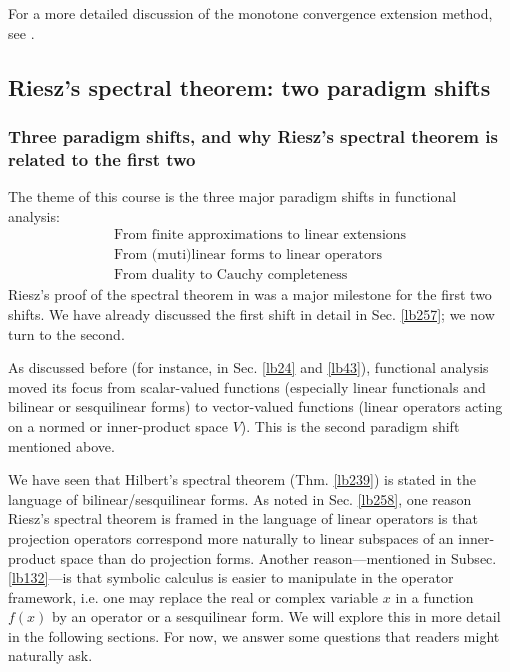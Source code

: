 \documentclass[12pt,b5paper,notitlepage]{article}
\theoremstyle{definition}
\theoremstyle{plain}
\numberwithin{equation}{section}
\begin{document}
For a more detailed discussion of the monotone convergence extension method, see \cite[Ch. 25]{Gui-A}.




\hypertarget{proofread}{}

\subsection{Riesz's spectral theorem: two paradigm shifts}\label{lb245}

\subsubsection{Three paradigm shifts, and why Riesz's spectral theorem is related to the first two}


The theme of this course is the three major paradigm shifts in functional analysis:
\begin{subequations}\label{eq147}
\begin{gather}
\text{From finite approximations to linear extensions}\label{eq147a}\\
\text{From (muti)linear forms to linear operators}\label{eq147b}\\
\text{From duality to Cauchy completeness}\label{eq147c}
\end{gather}
\end{subequations}
Riesz's proof of the spectral theorem in \cite{Rie13} was a major milestone for the first two shifts. We have already discussed the first shift in detail in Sec. \ref{lb257}; we now turn to the second.


As discussed before (for instance, in Sec. \ref{lb24} and \ref{lb43}), functional analysis moved its focus from scalar-valued functions (especially linear functionals and bilinear or sesquilinear forms) to vector-valued functions (linear operators acting on a normed or inner-product space $V$). This is the second paradigm shift mentioned above.



We have seen that Hilbert's spectral theorem (Thm. \ref{lb239}) is stated in the language of bilinear/sesquilinear forms. As noted in Sec. \ref{lb258}, one reason Riesz's spectral theorem is framed in the language of linear operators is that projection operators correspond more naturally to linear subspaces of an inner-product space than do projection forms. Another reason---mentioned in Subsec. \ref{lb132}---is that symbolic calculus is easier to manipulate in the operator framework, i.e. one may replace the real or complex variable $x$ in a function $f(x)$ by an operator or a sesquilinear form. We will explore this in more detail in the following sections. For now, we answer some questions that readers might naturally ask.
\end{document}
